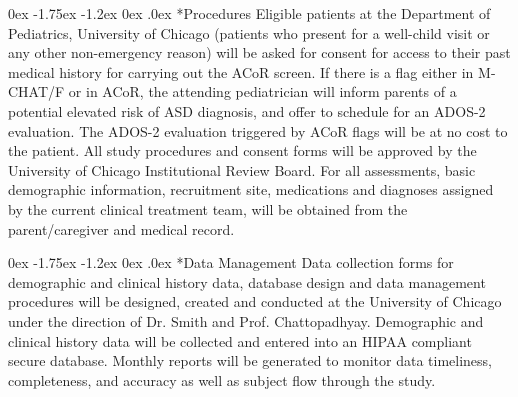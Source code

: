\documentclass[onecolumn, compsoc,11pt]{IEEEtran}
\makeatletter
\renewcommand\section{\@startsection {section}{1}{\z@}%
                                   {-1pt \@plus -30ex \@minus 20ex}%
                                   {.1pt}%
                                   {\large\bfseries\scshape}}
\renewcommand\subsection{\@startsection {subsection}{2}{\z@}%
                                   {0ex \@plus -1.75ex \@minus -1.2ex}%
                                   {0ex \@plus.0ex}%
                                   {\fontsize{11}{11}\selectfont\bfseries\sffamily\color{black}}}
\def\ZERO{ACoR\xspace}
\makeatother
\begin{document}
\subsection*{Procedures} Eligible patients at the Department of Pediatrics, University of Chicago (patients who present for a well-child visit or any other non-emergency reason) will be asked  for consent for access to their past medical history for carrying out the \ZERO screen. %
If there is a flag either in M-CHAT/F or in \ZERO, the attending pediatrician will inform parents of a potential elevated risk of ASD diagnosis, and offer to schedule for an ADOS-2 evaluation. The ADOS-2 evaluation triggered by \ZERO flags will be at no cost to the patient. All study procedures and consent forms will be approved by the University of Chicago Institutional Review Board.  For all assessments, basic demographic information, recruitment site, medications and diagnoses assigned by the current clinical treatment team, will be obtained from the parent/caregiver and medical record.

\subsection*{Data Management} Data collection forms for demographic and clinical history data, database design and data management procedures will be designed, created and conducted at the University of Chicago under the
direction of Dr. Smith and Prof. Chattopadhyay. Demographic and clinical history data will be collected and entered into an HIPAA compliant secure database.  Monthly reports will be generated  to monitor data timeliness, completeness, and accuracy as well as subject flow through the study. 

\end{document}
